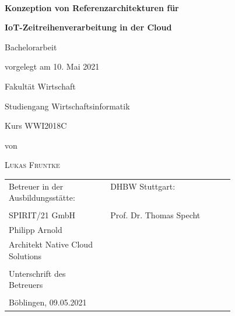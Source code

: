 \newcommand{\typMeinerArbeit}{Bachelorarbeit} 

\newcommand{\themaMeinerArbeit}{Konzeption von Referenzarchitekturen für IoT-Zeitreihenverarbeitung in der Cloud}

\newcommand{\meinName}{Lukas Fruntke}

\thispagestyle{empty}

\begin{spacing}{1}
\begin{center}	
~\vspace{0mm}

{\sffamily
\Large  
\textbf{Konzeption von Referenzarchitekturen für}

\bigskip
\textbf{IoT-Zeitreihenverarbeitung in der Cloud}
}


\vspace{15mm}

{\Large \typMeinerArbeit}

\vspace{1cm}

vorgelegt am 10. Mai 2021

\vspace{15mm}

Fakultät Wirtschaft
\medskip

Studiengang Wirtschaftsinformatik
\medskip

Kurs WWI2018C 

\vspace{10mm}

von

\vspace{10mm}

{\large\textsc{\meinName}}

\vspace{10mm}
\end{center}

\vfill

\begin{tabular}{p{0.45\linewidth}l}
Betreuer in der Ausbildungsstätte: & DHBW Stuttgart: \\
\hspace{0.4\linewidth} & \\
 SPIRIT/21 GmbH  &  Prof. Dr. Thomas Specht  \\
 Philipp Arnold    \\
 Architekt Native Cloud Solutions  \\
\\
Unterschrift des Betreuers \\
\noalign{\vspace{1.2cm}}    \\
Böblingen, 09.05.2021 \\
\end{tabular}



\end{spacing}
